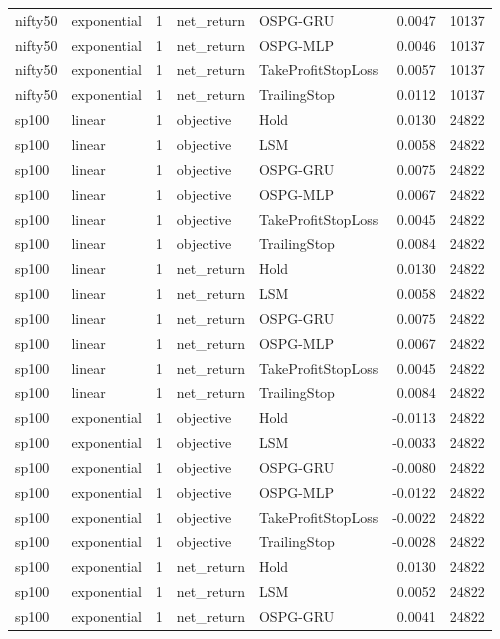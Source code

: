 \begin{longtable}{llrllrr}
nifty50 & exponential & 1 & net\_return & OSPG-GRU & 0.0047 & 10137 \\
nifty50 & exponential & 1 & net\_return & OSPG-MLP & 0.0046 & 10137 \\
nifty50 & exponential & 1 & net\_return & TakeProfitStopLoss & 0.0057 & 10137 \\
nifty50 & exponential & 1 & net\_return & TrailingStop & 0.0112 & 10137 \\
sp100 & linear & 1 & objective & Hold & 0.0130 & 24822 \\
sp100 & linear & 1 & objective & LSM & 0.0058 & 24822 \\
sp100 & linear & 1 & objective & OSPG-GRU & 0.0075 & 24822 \\
sp100 & linear & 1 & objective & OSPG-MLP & 0.0067 & 24822 \\
sp100 & linear & 1 & objective & TakeProfitStopLoss & 0.0045 & 24822 \\
sp100 & linear & 1 & objective & TrailingStop & 0.0084 & 24822 \\
sp100 & linear & 1 & net\_return & Hold & 0.0130 & 24822 \\
sp100 & linear & 1 & net\_return & LSM & 0.0058 & 24822 \\
sp100 & linear & 1 & net\_return & OSPG-GRU & 0.0075 & 24822 \\
sp100 & linear & 1 & net\_return & OSPG-MLP & 0.0067 & 24822 \\
sp100 & linear & 1 & net\_return & TakeProfitStopLoss & 0.0045 & 24822 \\
sp100 & linear & 1 & net\_return & TrailingStop & 0.0084 & 24822 \\
sp100 & exponential & 1 & objective & Hold & -0.0113 & 24822 \\
sp100 & exponential & 1 & objective & LSM & -0.0033 & 24822 \\
sp100 & exponential & 1 & objective & OSPG-GRU & -0.0080 & 24822 \\
sp100 & exponential & 1 & objective & OSPG-MLP & -0.0122 & 24822 \\
sp100 & exponential & 1 & objective & TakeProfitStopLoss & -0.0022 & 24822 \\
sp100 & exponential & 1 & objective & TrailingStop & -0.0028 & 24822 \\
sp100 & exponential & 1 & net\_return & Hold & 0.0130 & 24822 \\
sp100 & exponential & 1 & net\_return & LSM & 0.0052 & 24822 \\
sp100 & exponential & 1 & net\_return & OSPG-GRU & 0.0041 & 24822 \\

\end{longtable}
